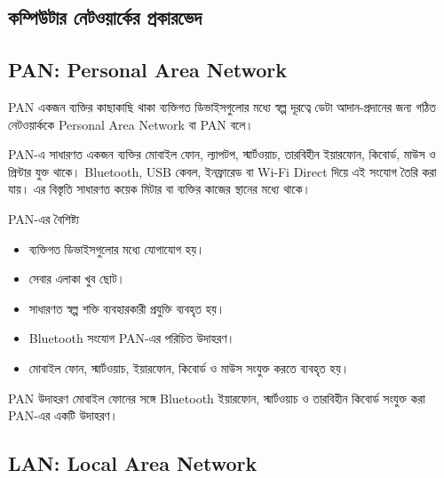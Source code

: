 \subsection{কম্পিউটার নেটওয়ার্কের প্রকারভেদ}




\subsection{PAN: Personal Area Network}

\begin{definitionbox}{PAN}
একজন ব্যক্তির কাছাকাছি থাকা ব্যক্তিগত ডিভাইসগুলোর মধ্যে স্বল্প দূরত্বে ডেটা আদান-প্রদানের জন্য গঠিত নেটওয়ার্ককে Personal Area Network বা PAN বলে।
\end{definitionbox}

PAN-এ সাধারণত একজন ব্যক্তির মোবাইল ফোন, ল্যাপটপ, স্মার্টওয়াচ, তারবিহীন ইয়ারফোন, কিবোর্ড, মাউস ও প্রিন্টার যুক্ত থাকে। Bluetooth, USB কেবল, ইনফ্রারেড বা Wi-Fi Direct দিয়ে এই সংযোগ তৈরি করা যায়। এর বিস্তৃতি সাধারণত কয়েক মিটার বা ব্যক্তির কাজের স্থানের মধ্যে থাকে।

\begin{keypointbox}{PAN-এর বৈশিষ্ট্য}
\begin{itemize}
\item ব্যক্তিগত ডিভাইসগুলোর মধ্যে যোগাযোগ হয়।
\item সেবার এলাকা খুব ছোট।
\item সাধারণত স্বল্প শক্তি ব্যবহারকারী প্রযুক্তি ব্যবহৃত হয়।
\item Bluetooth সংযোগ PAN-এর পরিচিত উদাহরণ।
\item মোবাইল ফোন, স্মার্টওয়াচ, ইয়ারফোন, কিবোর্ড ও মাউস সংযুক্ত করতে ব্যবহৃত হয়।
\end{itemize}
\end{keypointbox}

\begin{examplebox}{PAN উদাহরণ}
মোবাইল ফোনের সঙ্গে Bluetooth ইয়ারফোন, স্মার্টওয়াচ ও তারবিহীন কিবোর্ড সংযুক্ত করা PAN-এর একটি উদাহরণ।
\end{examplebox}

\subsection{LAN: Local Area Network}


